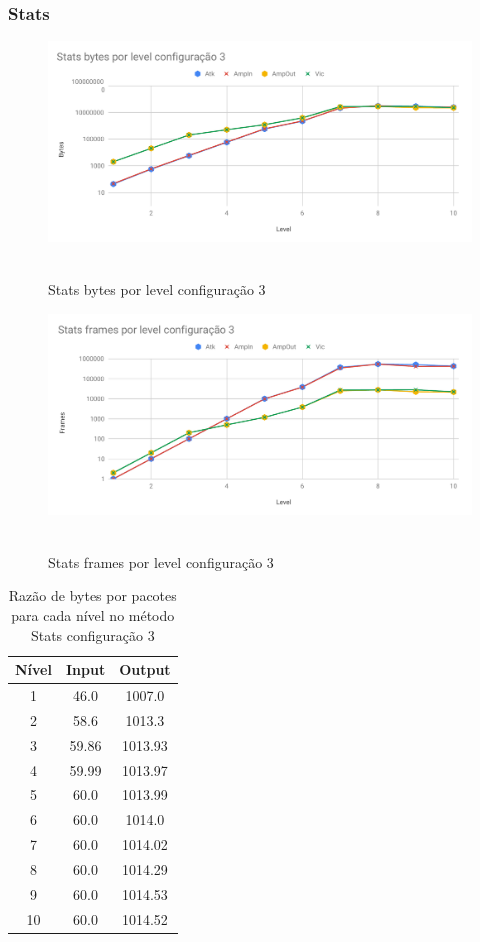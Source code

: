 \subsubsection{Stats}

\begin{figure}[H]
     \centering
     \label{graf:StatsBytes3}
     \includegraphics[scale=0.6]{img/capturas/StatsBLC3.pdf}\
     \caption{Stats bytes por level configuração 3}
\end{figure}

\begin{figure}[H]
     \centering
     \label{graf:StatsFrames3}
     \includegraphics[scale=0.6]{img/capturas/StatsFLC3.pdf}\
     \caption{Stats frames por level configuração 3}
\end{figure}

\begin{table}[H]
\centering
\label{tab:bytespacsStats3}
\caption{Razão de bytes por pacotes para cada nível no método Stats configuração 3}
\begin{tabular}{|c|c|c|}
\hline
Nível & Input & Output  \\ \hline
1     & 46.0  & 1007.0  \\ \hline
2     & 58.6  & 1013.3  \\ \hline
3     & 59.86 & 1013.93 \\ \hline
4     & 59.99 & 1013.97 \\ \hline
5     & 60.0  & 1013.99 \\ \hline
6     & 60.0  & 1014.0  \\ \hline
7     & 60.0  & 1014.02 \\ \hline
8     & 60.0  & 1014.29 \\ \hline
9     & 60.0  & 1014.53 \\ \hline
10    & 60.0  & 1014.52 \\ \hline
\end{tabular}
\end{table}

